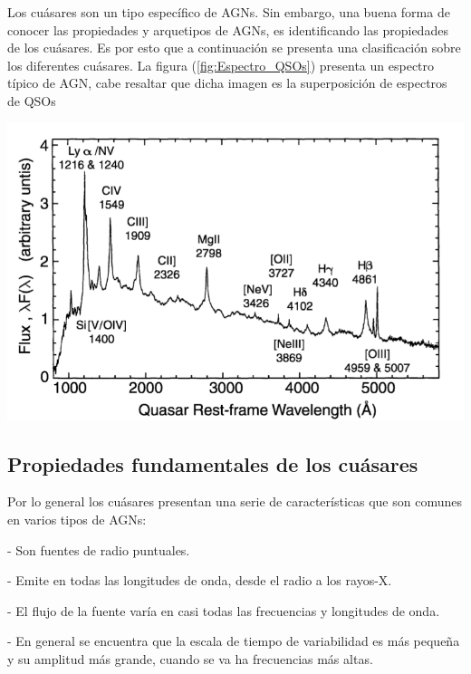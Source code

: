 Los cuásares son un tipo específico de AGNs. Sin embargo, una buena forma de conocer las propiedades y arquetipos de  AGNs, es identificando las propiedades de los cuásares. Es por esto que a continuación se presenta una clasificación sobre los diferentes cuásares.  La figura (\ref{fig:Espectro_QSOs}) presenta un espectro típico de AGN, cabe resaltar que dicha imagen es la superposición de espectros de QSOs

\begin{center}
\includegraphics[scale=.3]{./figures/3_AGNs/Espectro_tipico_AGN.png}
\label{fig:Espectro_QSOs}
\end{center}
	\subsection{Propiedades fundamentales de los cuásares}
	\label{subsec:Fundamental_properties_quasars}

Por lo general los cuásares presentan una serie de características que son comunes en varios tipos de AGNs:


- Son fuentes de radio puntuales. 

- Emite en todas las longitudes de onda, desde el radio a los rayos-X.

- El flujo de la fuente varía en casi todas las frecuencias y longitudes de onda.

- En general se encuentra que la escala de tiempo de variabilidad es más pequeña y su amplitud más grande, cuando se va ha frecuencias más altas.

